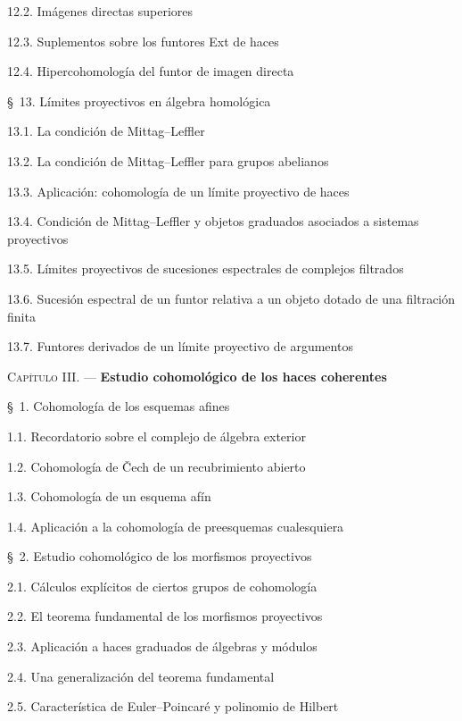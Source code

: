 \documentclass[oneside]{amsart}
\newcommand{\oldpage}[2][]{{\marginnote{\normalfont\textbf{#1}~|~#2}}\ignorespaces}
\begin{document}
\begin{flushleft}
12.2. Imágenes directas superiores 

12.3. Suplementos sobre los funtores Ext de haces 

12.4. Hipercohomología del funtor de imagen directa 

\oldpage[III]{166}

\S~13. Límites proyectivos en álgebra homológica 

13.1. La condición de Mittag--Leffler 

13.2. La condición de Mittag--Leffler para grupos abelianos 

13.3. Aplicación: cohomología de un límite proyectivo de haces 

13.4. Condición de Mittag--Leffler y objetos graduados asociados a sistemas
proyectivos 

13.5. Límites proyectivos de sucesiones espectrales de complejos filtrados

13.6. Sucesión espectral de un funtor relativa a un objeto dotado de una
filtración finita 

13.7. Funtores derivados de un límite proyectivo de argumentos 

\medskip
\textsc{Capítulo III.} --- \textbf{Estudio cohomológico de los haces coherentes}

\medskip
\S~1. Cohomología de los esquemas afines 

1.1. Recordatorio sobre el complejo de álgebra exterior 

1.2. Cohomología de \v Cech de un recubrimiento abierto 

1.3. Cohomología de un esquema afín 

1.4. Aplicación a la cohomología de preesquemas cualesquiera 

\medskip
\S~2. Estudio cohomológico de los morfismos proyectivos 

2.1. Cálculos explícitos de ciertos grupos de cohomología 

2.2. El teorema fundamental de los morfismos proyectivos 

2.3. Aplicación a haces graduados de álgebras y módulos 

2.4. Una generalización del teorema fundamental 

2.5. Característica de Euler--Poincaré y polinomio de Hilbert 


\end{flushleft}
\end{document}
